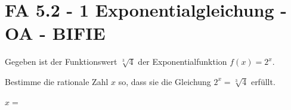 \section{FA 5.2 - 1 Exponentialgleichung - OA - BIFIE}

\begin{beispiel}[FA 5.2]{1} %
Gegeben ist der Funktionswert $\sqrt[3]{4}$ der Exponentialfunktion $f(x) = 2^x$.
 \leer

Bestimme die rationale Zahl $x$ so, dass sie die Gleichung $2^x = \sqrt[3]{4}$ erfüllt.

\leer

$x=$\,
\end{beispiel}